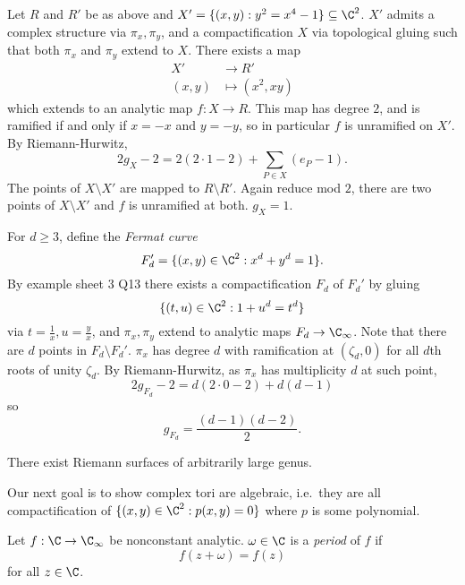 \documentclass[a4paper]{article}
\begin{document}
\begin{eg}
  Let \(R\) and \(R'\) be as above and \(X' = \{(x, y): y^2 = x^4 - 1\} \subseteq \C^2\). \(X'\) admits a complex structure via \(\pi_x, \pi_y\), and a compactification \(X\) via topological gluing such that both \(\pi_x\) and \(\pi_y\) extend to \(X\). There exists a map
  \begin{align*}
    X' &\to R' \\
    (x, y) &\mapsto (x^2, xy)
  \end{align*}
  which extends to an analytic map \(f: X \to R\). This map has degree \(2\), and is ramified if and only if \(x = -x\) and \(y = -y\), so in particular \(f\) is unramified on \(X'\). By Riemann-Hurwitz,
  \[
    2g_X - 2 = 2(2 \cdot 1 - 2) + \sum_{P \in X} (e_P - 1).
  \]
  The points of \(X \setminus X'\) are mapped to \(R \setminus R'\). Again reduce mod \(2\), there are two points of \(X \setminus X'\) and \(f\) is unramified at both. \(g_X = 1\).
\end{eg}

\begin{eg}
  For \(d \geq 3\), define the \emph{Fermat curve}
  \[
    F_d' = \{(x, y) \in \C^2: x^d + y^d = 1\}.
  \]
  By example sheet 3 Q13 there exists a compactification \(F_d\) of \(F_d'\) by gluing
  \[
    \{(t, u) \in \C^2: 1+ u^d = t^d\}
  \]
  via \(t = \frac{1}{x}, u = \frac{y}{x}\), and \(\pi_x, \pi_y\) extend to analytic maps \(F_d \to \C_\infty\). Note that there are \(d\) points in \(F_d \setminus F_d'\). \(\pi_x\) has degree \(d\) with ramification at \((\zeta_d, 0)\) for all \(d\)th roots of unity \(\zeta_d\). By Riemann-Hurwitz, as \(\pi_x\) has multiplicity \(d\) at such point,
\[
  2g_{F_d} - 2 = d(2 \cdot 0 - 2) + d(d - 1)
\]
so
\[
  g_{F_d} = \frac{(d - 1)(d - 2)}{2}.
\]
\end{eg}

\begin{corollary}
  There exist Riemann surfaces of arbitrarily large genus.
\end{corollary}

Our next goal is to show complex tori are algebraic, i.e.\ they are all compactification of \(\{(x, y) \in \C^2: p(x, y) = 0\}\) where \(p\) is some polynomial.

\begin{definition}[period]
  Let \(f: \C \to \C_\infty\) be nonconstant analytic. \(\omega \in \C\) is a \emph{period} of \(f\) if
  \[
    f(z + \omega) = f(z)
  \]
  for all \(z \in \C\).
\end{definition}
\end{document}
